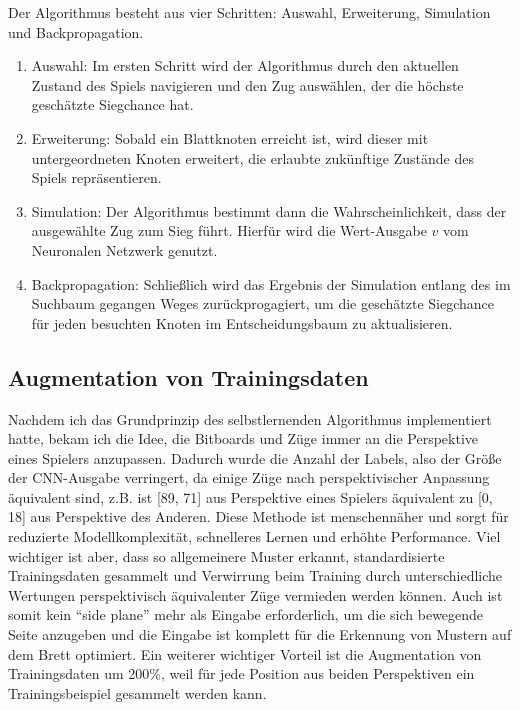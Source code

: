 \documentclass{jpp}
\begin{document}
Der Algorithmus besteht aus vier Schritten: Auswahl, Erweiterung, Simulation und Backpropagation.
\begin{enumerate}

\item Auswahl: Im ersten Schritt wird der Algorithmus durch den aktuellen Zustand des Spiels navigieren und den Zug auswählen, der die höchste geschätzte Siegchance hat.

\item Erweiterung: Sobald ein Blattknoten erreicht ist, wird dieser mit untergeordneten Knoten erweitert, die erlaubte zukünftige Zustände des Spiels repräsentieren.

\item Simulation: Der Algorithmus bestimmt dann die Wahrscheinlichkeit, dass der ausgewählte Zug zum Sieg führt. Hierfür wird die Wert-Ausgabe $v$ vom Neuronalen Netzwerk genutzt.

\item Backpropagation: Schließlich wird das Ergebnis der Simulation entlang des im Suchbaum gegangen Weges zurückprogagiert, um die geschätzte Siegchance für jeden besuchten Knoten im Entscheidungsbaum zu aktualisieren.
\end{enumerate}

\subsection{Augmentation von Trainingsdaten}
Nachdem ich das Grundprinzip des selbstlernenden Algorithmus  implementiert hatte, bekam ich die Idee, die Bitboards und Züge immer an die Perspektive eines  Spielers anzupassen.
Dadurch wurde die Anzahl der Labels, also der Größe der CNN-Ausgabe verringert, da einige Züge nach perspektivischer Anpassung äquivalent sind, z.B. ist [89, 71] aus Perspektive eines Spielers äquivalent zu [0, 18] aus Perspektive des Anderen. Diese Methode ist menschennäher und sorgt für reduzierte Modellkomplexität, schnelleres Lernen und erhöhte Performance. Viel wichtiger ist aber, dass so allgemeinere Muster erkannt, standardisierte Trainingsdaten gesammelt und Verwirrung beim Training durch unterschiedliche Wertungen perspektivisch äquivalenter Züge vermieden werden können. Auch ist somit kein “side plane” mehr als Eingabe erforderlich, um die sich bewegende Seite anzugeben und die Eingabe ist komplett für die Erkennung von Mustern auf dem Brett optimiert. Ein weiterer wichtiger Vorteil ist die Augmentation von Trainingsdaten um 200\%, weil für jede Position aus beiden Perspektiven ein Trainingsbeispiel gesammelt werden kann.
\end{document}
